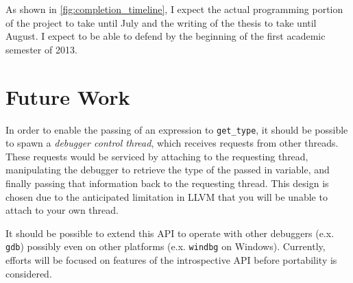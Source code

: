 \documentclass[draft]{article}
\begin{document}
As shown in \vref{fig:completion_timeline}, I expect the actual programming
portion of the project to take until July and the writing of the thesis to take
until August. I expect to be able to defend by the beginning of the first
academic semester of 2013.

\section{Future Work}
\label{sec:future_work}
In order to enable the passing of an expression to \texttt{get\_type}, it should
be possible to spawn a \emph{debugger control thread}, which receives requests
from other threads. These requests would be serviced by attaching to the
requesting thread, manipulating the debugger to retrieve the type of the passed
in variable, and finally passing that information back to the requesting thread.
This design is chosen due to the anticipated limitation in LLVM that you will be
unable to attach to your own thread.

It should be possible to extend this API to operate with other debuggers (e.x.
\texttt{gdb}) possibly even on other platforms (e.x. \texttt{windbg} on
Windows). Currently, efforts will be focused on features of the introspective
API before portability is considered.

\onecolumn
\printbibliography
\end{document}
